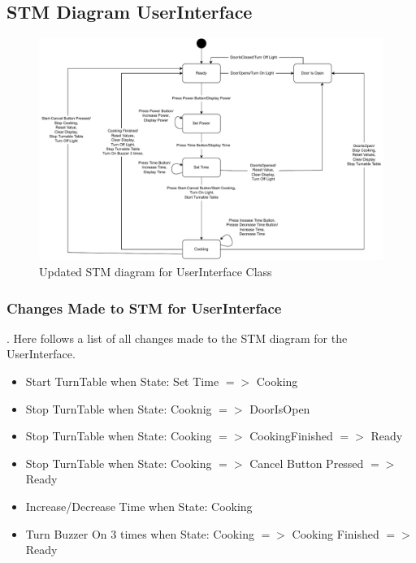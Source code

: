 \subsection{STM Diagram UserInterface}
\begin{figure}[h]
  \centering
  \includegraphics[scale=0.6]{02-Body/Image/STM_UserInterfacer.pdf}
  \caption{Updated STM diagram for UserInterface Class}%
  \label{fig:UserInterfaceSTM}
\end{figure}

\subsubsection{Changes Made to STM for UserInterface}.
Here follows a list of all changes made to the STM diagram for the UserInterface.

\begin{itemize}
  \item Start TurnTable when State: Set Time $=>$ Cooking
  \item Stop TurnTable when State: Cooknig $=>$ DoorIsOpen
  \item Stop TurnTable when State: Cooking $=>$ CookingFinished $=>$ Ready
  \item Stop TurnTable when State: Cooking $=>$ Cancel Button Pressed $=>$ Ready
  \item Increase/Decrease Time when State: Cooking
  \item Turn Buzzer On 3 times when State: Cooking $=>$ Cooking Finished $=>$ Ready 
\end{itemize}



